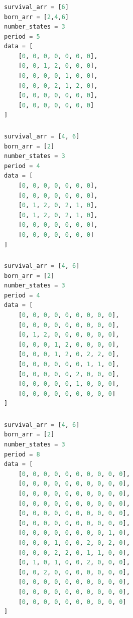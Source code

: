 \documentclass[12pt]{article}
\numberwithin{figure}{section} %
\begin{document}
\noindent\begin{minipage}{.45\textwidth}
\subsubsection{}
\begin{lstlisting}[language = Python]
survival_arr = [6]
born_arr = [2,4,6]
number_states = 3
period = 5
data = [
    [0, 0, 0, 0, 0, 0, 0],
    [0, 0, 1, 2, 0, 0, 0],
    [0, 0, 0, 0, 1, 0, 0],
    [0, 0, 0, 2, 1, 2, 0],
    [0, 0, 0, 0, 0, 0, 0],
    [0, 0, 0, 0, 0, 0, 0]
]
\end{lstlisting}
\end{minipage}\hfill
\begin{minipage}{.5\textwidth}
\subsubsection{}
\begin{lstlisting}[language = Python]
survival_arr = [4, 6]
born_arr = [2]
number_states = 3
period = 4
data = [
    [0, 0, 0, 0, 0, 0, 0],
    [0, 0, 0, 0, 0, 0, 0],
    [0, 1, 2, 0, 2, 1, 0],
    [0, 1, 2, 0, 2, 1, 0],
    [0, 0, 0, 0, 0, 0, 0],
    [0, 0, 0, 0, 0, 0, 0]
]
\end{lstlisting}
\end{minipage}

\subsubsection{}
\begin{lstlisting}[language = Python]
survival_arr = [4, 6]
born_arr = [2]
number_states = 3
period = 4
data = [
    [0, 0, 0, 0, 0, 0, 0, 0, 0],
    [0, 0, 0, 0, 0, 0, 0, 0, 0],
    [0, 1, 2, 0, 0, 0, 0, 0, 0],
    [0, 0, 0, 1, 2, 0, 0, 0, 0],
    [0, 0, 0, 1, 2, 0, 2, 2, 0],
    [0, 0, 0, 0, 0, 0, 1, 1, 0],
    [0, 0, 0, 0, 0, 2, 0, 0, 0],
    [0, 0, 0, 0, 0, 1, 0, 0, 0],
    [0, 0, 0, 0, 0, 0, 0, 0, 0]
]

\end{lstlisting}

\subsubsection{}
\begin{lstlisting}[language = Python]
survival_arr = [4, 6]
born_arr = [2]
number_states = 3
period = 8
data = [
    [0, 0, 0, 0, 0, 0, 0, 0, 0, 0],
    [0, 0, 0, 0, 0, 0, 0, 0, 0, 0],
    [0, 0, 0, 0, 0, 0, 0, 0, 0, 0],
    [0, 0, 0, 0, 0, 0, 0, 0, 0, 0],
    [0, 0, 0, 0, 0, 0, 0, 0, 0, 0],
    [0, 0, 0, 0, 0, 0, 0, 0, 0, 0],
    [0, 0, 0, 0, 0, 0, 0, 0, 1, 0],
    [0, 0, 0, 1, 0, 0, 2, 0, 2, 0],
    [0, 0, 0, 2, 2, 0, 1, 1, 0, 0],
    [0, 1, 0, 1, 0, 0, 2, 0, 0, 0],
    [0, 0, 2, 0, 0, 0, 0, 0, 0, 0],
    [0, 0, 0, 0, 0, 0, 0, 0, 0, 0],
    [0, 0, 0, 0, 0, 0, 0, 0, 0, 0],
    [0, 0, 0, 0, 0, 0, 0, 0, 0, 0]
]
\end{lstlisting}
\end{document}
